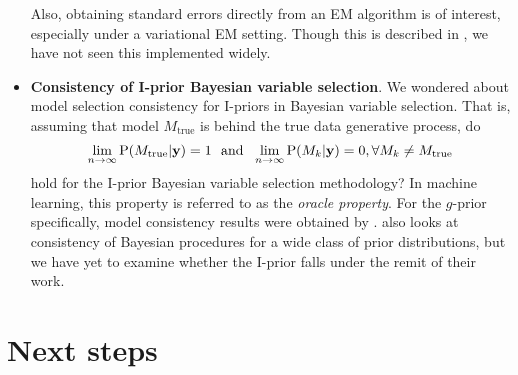 \documentclass[a4paper,showframe,11pt]{report}
\begin{document}
\begin{itemize}
  Also, obtaining standard errors directly from an EM algorithm is of interest, especially under a variational EM setting.
  Though this is described in \citet[Ch. 4]{mclachlan2007algorithm}, we have not seen this implemented widely.
  
  \item \textbf{Consistency of I-prior Bayesian variable selection}.
  We wondered about model selection consistency for I-priors in Bayesian variable selection.
  That is, assuming that model $M_\text{true}$ is behind the true data generative process, do
  \[
    \lim_{n\to\infty} \operatorname{P}(M_\text{true}|{\mathbf y}) = 1
    \ \ \text{and} \ \
    \lim_{n\to\infty} \operatorname{P}(M_k|{\mathbf y}) = 0, \forall M_k \neq M_\text{true}
  \]
  hold for the I-prior Bayesian variable selection methodology?
  In machine learning, this property is referred to as the \emph{oracle property}.
  For the $g$-prior specifically, model consistency results were obtained by \citet{fernandez2001benchmark,liang2008mixtures}.
  \citet{casella2009consistency} also looks at consistency of Bayesian procedures for a wide class of prior distributions, but we have yet to examine whether the I-prior falls under the remit of their work.
  
\end{itemize}

\newpage
\section{Next steps}
\end{document}

